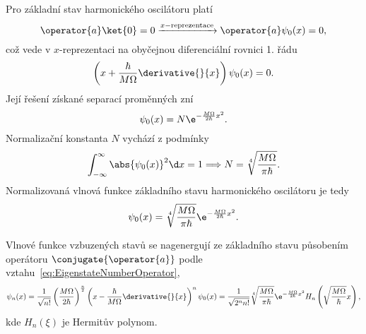 \begin{solution}
\begin{enumerate}
        Pro základní stav harmonického oscilátoru platí
        \begin{equation}
            \operator{a}\ket{0}=0
            \xrightarrow{x-\text{reprezentace}}
            \operator{a}\psi_{0}(x)=0,
        \end{equation}
        což vede v $x$-reprezentaci na obyčejnou diferenciální rovnici 1. řádu
        \begin{equation}
            \left(x+\frac{\hbar}{M\Omega}\derivative{}{x}\right)\psi_{0}(x)=0.
        \end{equation}
        Její řešení získané separací proměnných zní
        \begin{equation}
            \psi_{0}(x)
                =N\e^{-\frac{M\Omega}{2\hbar}x^{2}}.
        \end{equation}
        Normalizační konstanta $N$ vychází z podmínky
        \begin{equation}
            \int_{-\infty}^{\infty}\abs{\psi_{0}(x)}^{2}\d x=1
            \Longrightarrow
            N=\sqrt[4]{\frac{M\Omega}{\pi\hbar}}.
        \end{equation}
        Normalizovaná vlnová funkce základního stavu harmonického oscilátoru je tedy
        \begin{equation}
            \psi_{0}(x)
                =\sqrt[4]{\frac{M\Omega}{\pi\hbar}}\e^{-\frac{M\Omega}{2\hbar}x^{2}}.
        \end{equation}

        Vlnové funkce vzbuzených stavů se nagenergují ze základního stavu působením operátoru $\conjugate{\operator{a}}$ podle vztahu~\eqref{eq:EigenstateNumberOperator},
        \begin{align}
            \psi_{n}(x)
                =\frac{1}{\sqrt{n!}}\left(\frac{M\Omega}{2\hbar}\right)^{\frac{n}{2}}\left(x-\frac{\hbar}{M\Omega}\derivative{}{x}\right)^{n}\psi_{0}(x)
                =\frac{1}{\sqrt{2^{n}n!}}\sqrt[4]{\frac{M\Omega}{\pi\hbar}}\e^{-\frac{M\Omega}{2\hbar}x^{2}}H_{n}\left(\sqrt{\frac{M\Omega}{\hbar}}x\right),
        \end{align}
        kde $H_{n}(\xi)$ je Hermitův polynom.
    \end{enumerate}    
\end{solution}	
